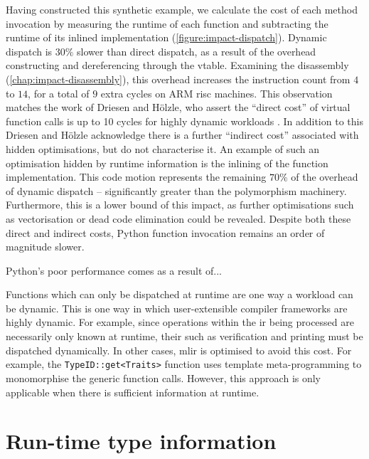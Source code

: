 Having constructed this synthetic example, we calculate the cost of each method invocation by measuring the runtime of each function and subtracting the runtime of its inlined implementation (\autoref{figure:impact-dispatch}).
Dynamic dispatch is $30\%$ slower than direct dispatch, as a result of the overhead constructing and dereferencing through the \ac{vtable}. Examining the disassembly (\autoref{chap:impact-disassembly}), this overhead increases the instruction count from $4$ to $14$, for a total of $9$ extra cycles on ARM \ac{risc} machines. This observation matches the work of Driesen and H\"olzle, who assert the ``direct cost'' of virtual function calls is up to 10 cycles for highly dynamic workloads \cite[Figure 18.]{driesenDirectCostVirtual1996}.
In addition to this Driesen and H\"olzle acknowledge there is a further ``indirect cost'' associated with hidden optimisations, but do not characterise it.
An example of such an optimisation hidden by runtime information is the inlining of the function implementation. This code motion represents the remaining $70\%$ of the overhead of dynamic dispatch -- significantly greater than the polymorphism machinery. Furthermore, this is a lower bound of this impact, as further optimisations such as vectorisation or dead code elimination could be revealed.
Despite both these direct and indirect costs, Python function invocation remains an order of magnitude slower.

Python's poor performance comes as a result of...

Functions which can only be dispatched at runtime are one way a workload can be dynamic.
This is one way in which user-extensible compiler frameworks are highly dynamic. For example, since operations within the \ac{ir} being processed are necessarily only known at runtime, their such as verification and printing must be dispatched dynamically.
In other cases, \ac{mlir} is optimised to avoid this cost. For example, the \texttt{TypeID::get<Traits>} function uses template meta-programming to monomorphise the generic function calls. However, this approach is only applicable when there is sufficient information at runtime.




\section{Run-time type information}
\label{sec:dynamism-pattern-rewriting-rtti}


